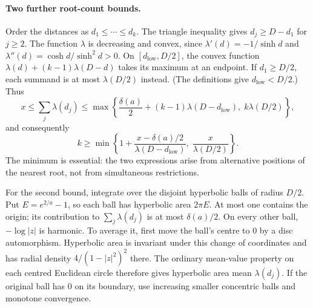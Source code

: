 \paragraph{Two further root-count bounds.}
Order the distances as $d_1\le\cdots\le d_k$. The triangle inequality gives
$d_j\ge D-d_1$ for $j\ge2$. The function $\lambda$ is decreasing and convex,
since $\lambda'(d)=-1/\sinh d$ and
$\lambda''(d)=\cosh d/\sinh^2d>0$. On
$[d_{\mathrm{low}},D/2]$, the convex function
$\lambda(d)+(k-1)\lambda(D-d)$ takes its maximum at an endpoint.
If $d_1\ge D/2$, each summand is at most $\lambda(D/2)$ instead.
(The definitions give $d_{\mathrm{low}}<D/2$.) Thus
\[
 x\le\sum_j\lambda(d_j)
 \le\max\left\{
  \frac{\delta(a)}2+(k-1)\lambda(D-d_{\mathrm{low}}),\;
  k\lambda(D/2)\right\},
\]
and consequently
\[
 k\ge\min\left\{
  1+\frac{x-\delta(a)/2}{\lambda(D-d_{\mathrm{low}})},\;
  \frac{x}{\lambda(D/2)}\right\}.
\]
The minimum is essential: the two expressions arise from alternative
positions of the nearest root, not from simultaneous restrictions.

For the second bound, integrate over the disjoint hyperbolic balls of
radius $D/2$. Put $E=e^{2/a}-1$, so each ball has hyperbolic area $2\pi E$.
At most one contains the origin; its contribution to
$\sum_j\lambda(d_j)$ is at most $\delta(a)/2$.
On every other ball, $-\log|z|$ is harmonic. To average it, first move
the ball's centre to $0$ by a disc automorphism. Hyperbolic area is
invariant under this change of coordinates and has radial density
$4/(1-|z|^2)^2$ there. The ordinary mean-value property on each centred
Euclidean circle therefore gives hyperbolic area mean
$\lambda(d_j)$. If the original ball has $0$ on its boundary, use
increasing smaller concentric balls and monotone convergence.

